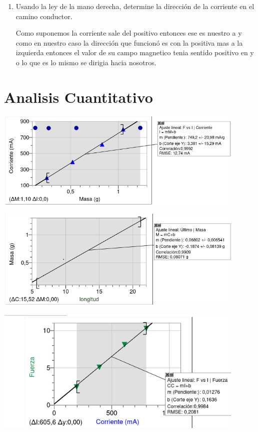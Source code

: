 \documentclass[12pt]{exam}
\newenvironment{Figura}
  {\par\medskip\noindent\minipage{\linewidth}}
  {\endminipage\par\medskip}
\begin{document}
\begin{multicols}{2}
\begin{enumerate}
\item Usando la ley de la mano derecha, determine la dirección de la corriente en el camino conductor.

Como suponemos la corriente sale del positivo entonces ese es nuestro a y como en nuestro caso la dirección que funcionó es con la positiva mas a la izquierda entonces el valor de su campo magnetico tenia sentido positivo en y o lo que es lo mismo se dirigia hacia nosotros.
\end{enumerate}
\section{Analisis Cuantitativo}
\begin{Figura}
    \centering
    \includegraphics[width=0.9\textwidth]{Img/Figura1_Lab12.png}
    \label{fig}
\end{Figura}
\begin{Figura}
    \centering
    \includegraphics[width=0.9\textwidth]{Img/Figura2_Lab12.png}
    \label{fig}
\end{Figura}
\begin{Figura}
    \centering
    \includegraphics[width=0.9\textwidth]{Img/Figura3_Lab12.png}

\end{Figura}
\end{multicols}
\end{document}
